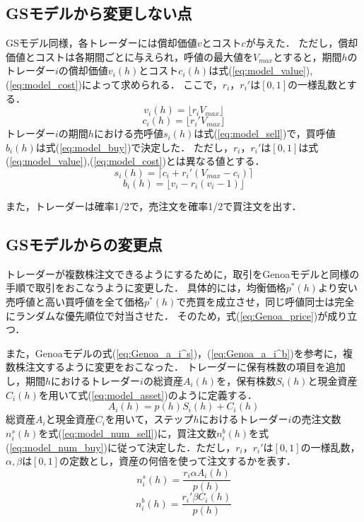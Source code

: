 \documentclass[titlepage]{jsreport}
\begin{document}
\subsection{GSモデルから変更しない点}
GSモデル同様，各トレーダーには償却価値$v$とコスト$c$が与えた．
ただし，償却価値とコストは各期間ごとに与えられ，呼値の最大値を$V_{max}$とすると，期間$h$のトレーダー$i$の償却価値$v_i(h)$とコスト$c_i(h)$は式(\ref{eq:model_value}),(\ref{eq:model_cost})によって求められる．
ここで，$r_i$，$r_i'$は$[0, 1]$の一様乱数とする．
\begin{equation}
    v_i(h) = \lfloor r_i V_{max} \rfloor \label{eq:model_value}
\end{equation}
\begin{equation}
    c_i(h) = \lfloor r_i' V_{max} \rfloor \label{eq:model_cost}
\end{equation}
トレーダー$i$の期間$h$における売呼値$s_i(h)$は式(\ref{eq:model_sell})で，買呼値$b_i(h)$は式(\ref{eq:model_buy})で決定した．
ただし，$r_i$，$r_i'$は$[0, 1]$は式(\ref{eq:model_value}),(\ref{eq:model_cost})とは異なる値とする．
\begin{equation}
    s_i(h) = \lceil c_i + r_i' (V_{max} - c_i) \rceil \label{eq:model_sell}
\end{equation}
\begin{equation}
    b_i(h) = \lfloor v_i - r_i (v_i - 1) \rfloor \label{eq:model_buy}
\end{equation}

また，トレーダーは確率1/2で，売注文を確率1/2で買注文を出す．

\subsection{GSモデルからの変更点}
トレーダーが複数株注文できるようにするために，取引をGenoaモデルと同様の手順で取引をおこなうように変更した．
具体的には，均衡価格$p^*(h)$より安い売呼値と高い買呼値を全て価格$p^*(h)$で売買を成立させ，同じ呼値同士は完全にランダムな優先順位で対当させた．
そのため，式(\ref{eq:Genoa_price})が成り立つ．

また，Genoaモデルの式(\ref{eq:Genoa_a_i^s})，(\ref{eq:Genoa_a_i^b})を参考に，複数株注文するように変更をおこなった．
トレーダーに保有株数の項目を追加し，期間$h$におけるトレーダー$i$の総資産$A_i(h)$を，保有株数$S_i(h)$と現金資産$C_i(h)$を用いて式(\ref{eq:model_asset})のように定義する．
\begin{equation}
    A_i(h) = p(h) S_i(h) + C_i(h) \label{eq:model_asset}
\end{equation}
総資産$A_i$と現金資産$C_i$を用いて，ステップ$h$におけるトレーダー$i$の売注文数$n_i^s(h)$を式(\ref{eq:model_num_sell})に，買注文数$n_i^b(h)$を式(\ref{eq:model_num_buy})に従って決定した．ただし，$r_i$，$r_i'$は$[0, 1]$の一様乱数，$\alpha, \beta$は$[0, 1]$の定数とし，資産の何倍を使って注文するかを表す．
\begin{equation}
    n_i^s(h) = \frac{r_i \alpha A_i(h)}{p(h)} \label{eq:model_num_sell}
\end{equation}
\begin{equation}
    n_i^b(h) = \frac{r_i' \beta C_i(h)}{p(h)} \label{eq:model_num_buy}
\end{equation}
\end{document}
